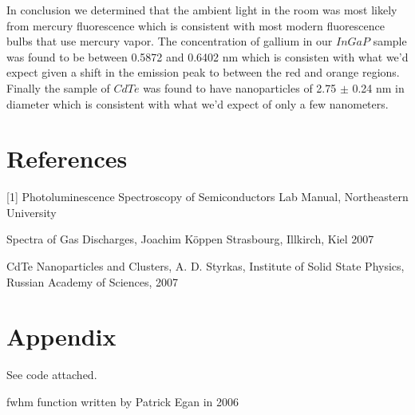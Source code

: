 \documentclass{article}
\begin{document}
In conclusion we determined that the ambient light in the room was most likely from mercury fluorescence which is consistent with most modern fluorescence bulbs that use mercury vapor.  The concentration of gallium in our $InGaP$ sample was found to be between 0.5872 and 0.6402 nm which is consisten with what we'd expect given a shift in the emission peak to between the red and orange regions.  Finally the sample of $CdTe$ was found to have nanoparticles of 2.75 $\pm$ 0.24 nm in diameter which is consistent with what we'd expect of only a few nanometers.

\section{References}

[1] Photoluminescence Spectroscopy of Semiconductors Lab Manual, Northeastern University

\noindent [2] Spectra of Gas Discharges, Joachim Köppen Strasbourg, Illkirch, Kiel 2007 

\noindent [3] CdTe Nanoparticles and Clusters, A. D. Styrkas, Institute of Solid State Physics, Russian Academy of Sciences, 2007

\section{Appendix}

See code attached.  

\noindent fwhm function written by Patrick Egan in 2006
\end{document}
